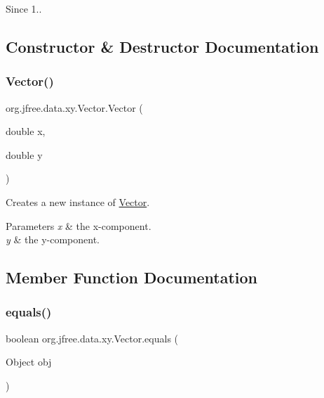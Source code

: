\begin{DoxySince}{Since}
1.. 
\end{DoxySince}


\subsection{Constructor \& Destructor Documentation}
\mbox{\label{classorg_1_1jfree_1_1data_1_1xy_1_1_vector_a65a8d9b25351cbdf1f45e53699d87dfe}} 
\subsubsection{\texorpdfstring{Vector()}{Vector()}}
{\footnotesize\ttfamily org.\+jfree.\+data.\+xy.\+Vector.\+Vector (\begin{DoxyParamCaption}\item[{double}]{x,  }\item[{double}]{y }\end{DoxyParamCaption})}

Creates a new instance of {\ttfamily \mbox{\hyperlink{classorg_1_1jfree_1_1data_1_1xy_1_1_vector}{Vector}}}.


\begin{DoxyParams}{Parameters}
{\em x} & the x-\/component. \\
\hline
{\em y} & the y-\/component. \\
\hline
\end{DoxyParams}


\subsection{Member Function Documentation}
\mbox{\label{classorg_1_1jfree_1_1data_1_1xy_1_1_vector_a6adc315128df854154ebc8c20e94cd9c}} 
\subsubsection{\texorpdfstring{equals()}{equals()}}
{\footnotesize\ttfamily boolean org.\+jfree.\+data.\+xy.\+Vector.\+equals (\begin{DoxyParamCaption}\item[{Object}]{obj }\end{DoxyParamCaption})}

